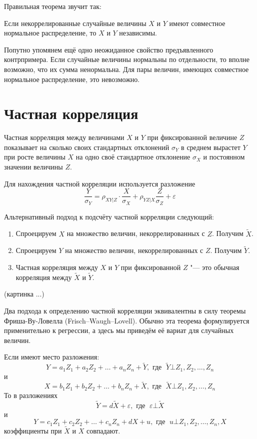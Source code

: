 \documentclass[10pt]{article}
\begin{document}
Правильная теорема звучит так:

\begin{theorem}
Если некоррелированные случайные величины $X$ и $Y$ имеют совместное нормальное распределение, то $X$ и $Y$ независимы.
\end{theorem}

Попутно упомянем ещё одно неожиданное свойство предъявленного контрпримера. Если случайные величины нормальны по отдельности, то вполне возможно, что их сумма ненормальна. Для пары величин, имеющих совместное нормальное распределение, это невозможно.


\section{Частная корреляция}

\begin{definition}
Частная корреляция между величинами $X$ и $Y$ при фиксированной величине $Z$ показывает на сколько своих стандартных отклонений $\sigma_Y$ в среднем вырастет $Y$ при росте величины $X$ на одно своё стандартное отклонение $\sigma_X$ и постоянном значении величины $Z$.
\end{definition}

Для нахождения частной корреляции используется разложение
\[
\frac{Y}{\sigma_Y}=\rho_{XY|Z} \cdot \frac{X}{\sigma_X} + \rho_{YZ|X} \frac{Z}{\sigma_Z} + \varepsilon
\]


Альтернативный подход к подсчёту частной корреляции следующий:
\begin{enumerate}
\item Спроецируем $X$ на множество величин, некоррелированных с $Z$. Получим $\tilde{X}$.
\item Спроецируем $Y$ на множество величин, некоррелированных с $Z$. Получим $\tilde{Y}$.
\item Частная корреляция между $X$ и $Y$ при фиксированной $Z$ "--- это обычная корреляция между $\tilde{X}$ и $\tilde{Y}$.
\end{enumerate}


(картинка ...)


Два подхода к определению частной корреляции эквивалентны в силу теоремы Фриша-Ву-Ловелла (Frisch–Waugh–Lovell). Обычно эта теорема формулируется применительно к регрессии, а здесь мы приведём её вариат для случайных величин.

\begin{theorem}
Если имеют место разложения:
\[
Y=a_1 Z_1 + a_2 Z_2 + \ldots + a_n Z_n + \tilde{Y}, \text{ где }\; \tilde{Y}\bot Z_1, Z_2, \ldots, Z_n
\]
и
\[
X=b_1 Z_1 + b_2 Z_2 + \ldots + b_n Z_n  + \tilde{X}, \text{ где }\; \tilde{X}\bot Z_1, Z_2, \ldots, Z_n
\]
То в разложениях  
\[
\tilde{Y}=d \tilde{X} + \varepsilon, \text{ где }\; \varepsilon \bot \tilde{X}
\]
и
\[
Y=c_1 Z_1 + c_2 Z_2 + \ldots + c_n Z_n  + dX + u, \text{ где }\; u \bot Z_1, Z_2, \ldots, Z_n, X
\]
коэффициенты при $\tilde{X}$ и $X$ совпадают.
\end{theorem}
\end{document}
